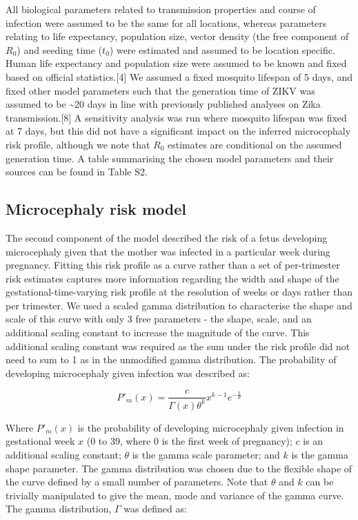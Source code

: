 \documentclass[10pt,letterpaper]{article}
\begin{document}
All biological parameters related to transmission properties and course
of infection were assumed to be the same for all locations, whereas
parameters relating to life expectancy, population size, vector density
(the free component of \(R_0\)) and seeding time (\(t_0\)) were
estimated and assumed to be location specific. Human life expectancy and
population size were assumed to be known and fixed based on official
statistics.{[}4{]} We assumed a fixed mosquito lifespan of 5 days, and
fixed other model parameters such that the generation time of ZIKV was
assumed to be \textasciitilde{}20 days in line with previously published
analyses on Zika transmission.{[}8{]} A sensitivity analysis was run
where mosquito lifespan was fixed at 7 days, but this did not have a
significant impact on the inferred microcephaly risk profile, although
we note that \(R_0\) estimates are conditional on the assumed generation
time. A table summarising the chosen model parameters and their sources
can be found in Table S2.

\subsection{Microcephaly risk model}\label{microcephaly-risk-model}

The second component of the model described the risk of a fetus
developing microcephaly given that the mother was infected in a
particular week during pregnancy. Fitting this risk profile as a curve
rather than a set of per-trimester risk estimates captures more
information regarding the width and shape of the
gestational-time-varying risk profile at the resolution of weeks or days
rather than per trimester. We used a scaled gamma distribution to
characterise the shape and scale of this curve with only 3 free
parameters - the shape, scale, and an additional scaling constant to
increase the magnitude of the curve. This additional scaling constant
was required as the sum under the risk profile did not need to sum to 1
as in the unmodified gamma distribution. The probability of developing
microcephaly given infection was described as:

\begin{equation}
P'_m(x) = \frac{c}{\Gamma(x)\theta^k }x^{k-1}e^{-\frac{x}{\theta}}
\end{equation}

Where \(P'_m(x)\) is the probability of developing microcephaly given
infection in gestational week \(x\) (0 to 39, where 0 is the first week
of pregnancy); \(c\) is an additional scaling constant; \(\theta\) is
the gamma scale parameter; and \(k\) is the gamma shape parameter. The
gamma distribution was chosen due to the flexible shape of the curve
defined by a small number of parameters. Note that \(\theta\) and \(k\)
can be trivially manipulated to give the mean, mode and variance of the
gamma curve. The gamma distribution, \(\Gamma\) was defined as:
\end{document}
